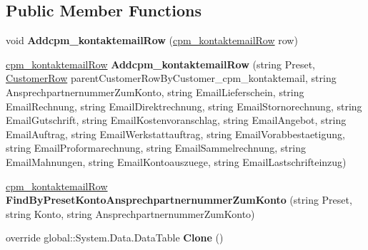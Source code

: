 \subsection*{Public Member Functions}
\begin{DoxyCompactItemize}
\item 
void {\bfseries Addcpm\+\_\+kontaktemail\+Row} (\hyperlink{class_products_1_1_data_1_1ds_sage_1_1cpm__kontaktemail_row}{cpm\+\_\+kontaktemail\+Row} row)\hypertarget{class_products_1_1_data_1_1ds_sage_1_1cpm__kontaktemail_data_table_a87151b84d7a22669631fdc4a69356f2b}{}\label{class_products_1_1_data_1_1ds_sage_1_1cpm__kontaktemail_data_table_a87151b84d7a22669631fdc4a69356f2b}

\item 
\hyperlink{class_products_1_1_data_1_1ds_sage_1_1cpm__kontaktemail_row}{cpm\+\_\+kontaktemail\+Row} {\bfseries Addcpm\+\_\+kontaktemail\+Row} (string Preset, \hyperlink{class_products_1_1_data_1_1ds_sage_1_1_customer_row}{Customer\+Row} parent\+Customer\+Row\+By\+Customer\+\_\+cpm\+\_\+kontaktemail, string Ansprechpartnernummer\+Zum\+Konto, string Email\+Lieferschein, string Email\+Rechnung, string Email\+Direktrechnung, string Email\+Stornorechnung, string Email\+Gutschrift, string Email\+Kostenvoranschlag, string Email\+Angebot, string Email\+Auftrag, string Email\+Werkstattauftrag, string Email\+Vorabbestaetigung, string Email\+Proformarechnung, string Email\+Sammelrechnung, string Email\+Mahnungen, string Email\+Kontoauszuege, string Email\+Lastschrifteinzug)\hypertarget{class_products_1_1_data_1_1ds_sage_1_1cpm__kontaktemail_data_table_abc97a2f5b2cd79455e9d72d9b55f487c}{}\label{class_products_1_1_data_1_1ds_sage_1_1cpm__kontaktemail_data_table_abc97a2f5b2cd79455e9d72d9b55f487c}

\item 
\hyperlink{class_products_1_1_data_1_1ds_sage_1_1cpm__kontaktemail_row}{cpm\+\_\+kontaktemail\+Row} {\bfseries Find\+By\+Preset\+Konto\+Ansprechpartnernummer\+Zum\+Konto} (string Preset, string Konto, string Ansprechpartnernummer\+Zum\+Konto)\hypertarget{class_products_1_1_data_1_1ds_sage_1_1cpm__kontaktemail_data_table_ac9a1a49efb670bdde442b3f7daaf9578}{}\label{class_products_1_1_data_1_1ds_sage_1_1cpm__kontaktemail_data_table_ac9a1a49efb670bdde442b3f7daaf9578}

\item 
override global\+::\+System.\+Data.\+Data\+Table {\bfseries Clone} ()\hypertarget{class_products_1_1_data_1_1ds_sage_1_1cpm__kontaktemail_data_table_a597641381abe62529c773a62fff6b01b}{}\label{class_products_1_1_data_1_1ds_sage_1_1cpm__kontaktemail_data_table_a597641381abe62529c773a62fff6b01b}


\end{DoxyCompactItemize}
